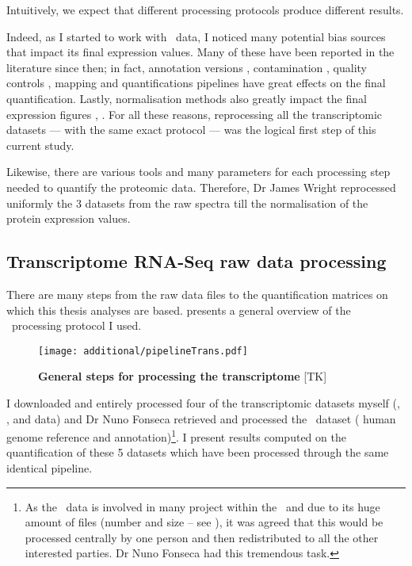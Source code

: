 Intuitively, we expect that different processing protocols produce
different results.

Indeed, as I started to work with \Rnaseq\ data, I noticed many potential bias
sources that impact its final expression values. Many of these have been
reported in the literature since then; in fact,
annotation versions ,
contamination ,
quality controls ,
mapping and quantifications pipelines 
have great effects on the final quantification. Lastly, normalisation
methods also greatly impact the final expression figures
, . For all these reasons,
reprocessing all the transcriptomic datasets --- with the same exact protocol ---
was the logical first step of this current study.

Likewise, there are various tools and many parameters for each processing step
needed to quantify the proteomic data. Therefore, Dr James Wright reprocessed
uniformly the 3 datasets from the raw spectra till the normalisation of the
protein expression values.

\subsection{Transcriptome RNA-Seq raw data processing}

There are many steps from the raw data files to the quantification matrices
on which this thesis analyses are based.  presents a
general overview of the \Rnaseq\ processing protocol I used.

\begin{figure}
    \texttt{[image: additional/pipelineTrans.pdf]}\centering
    \caption[General steps for processing the transcriptomic
    data]{\label{fig:pipelineTrans}\textbf{General steps for processing the
    transcriptome} [TK]}
\end{figure}

I downloaded and entirely processed four of the transcriptomic datasets
myself (, ,  and 
data) and Dr Nuno Fonseca retrieved and processed the \Gtex\ dataset (
human genome reference and  annotation)\footnote{As
the \Gtex\ data is involved in many project within the \EBI\
and due to its huge amount of files (number and  size -- see ),
it was agreed that this would be processed centrally by one person and then
redistributed to all the other interested parties. Dr Nuno Fonseca had this
tremendous task.}. I present results computed on the quantification of these
5 datasets which have been processed through the same identical pipeline.


